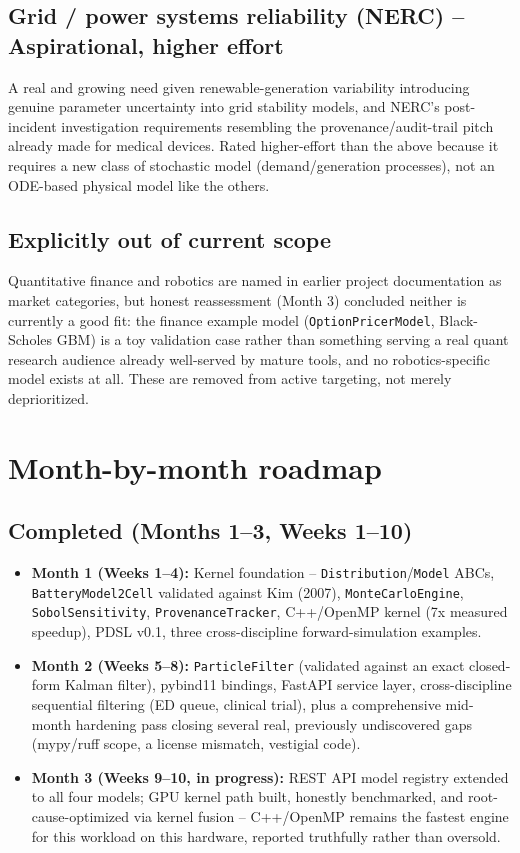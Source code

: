 \documentclass[11pt]{article}
\begin{document}
\subsection*{Grid / power systems reliability (NERC) -- Aspirational, higher effort}
A real and growing need given renewable-generation variability
introducing genuine parameter uncertainty into grid stability models,
and NERC's post-incident investigation requirements resembling the
provenance/audit-trail pitch already made for medical devices. Rated
higher-effort than the above because it requires a new class of
stochastic model (demand/generation processes), not an ODE-based
physical model like the others.

\subsection*{Explicitly out of current scope}
Quantitative finance and robotics are named in earlier project
documentation as market categories, but honest reassessment
(Month 3) concluded neither is currently a good fit: the finance
example model (\texttt{OptionPricerModel}, Black-Scholes GBM) is a
toy validation case rather than something serving a real quant
research audience already well-served by mature tools, and no
robotics-specific model exists at all. These are removed from active
targeting, not merely deprioritized.

\section*{Month-by-month roadmap}

\subsection*{Completed (Months 1--3, Weeks 1--10)}
\begin{itemize}[leftmargin=*]
  \item \textbf{Month 1 (Weeks 1--4):} Kernel foundation --
    \texttt{Distribution}/\texttt{Model} ABCs, \texttt{BatteryModel2Cell}
    validated against Kim (2007), \texttt{MonteCarloEngine},
    \texttt{SobolSensitivity}, \texttt{ProvenanceTracker}, C++/OpenMP
    kernel (7x measured speedup), PDSL v0.1, three cross-discipline
    forward-simulation examples.
  \item \textbf{Month 2 (Weeks 5--8):} \texttt{ParticleFilter}
    (validated against an exact closed-form Kalman filter), pybind11
    bindings, FastAPI service layer, cross-discipline sequential
    filtering (ED queue, clinical trial), plus a comprehensive
    mid-month hardening pass closing several real, previously
    undiscovered gaps (mypy/ruff scope, a license mismatch, vestigial
    code).
  \item \textbf{Month 3 (Weeks 9--10, in progress):} REST API model
    registry extended to all four models; GPU kernel path built,
    honestly benchmarked, and root-cause-optimized via kernel fusion
    -- C++/OpenMP remains the fastest engine for this workload on
    this hardware, reported truthfully rather than oversold.
\end{itemize}
\end{document}
